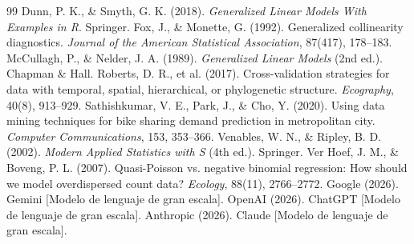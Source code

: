 \documentclass[12pt, a4paper]{article}
\numberwithin{equation}{section}
\begin{document}
\begin{thebibliography}{99}
 Dunn, P. K., \& Smyth, G. K. (2018). \textit{Generalized Linear Models With Examples in R}. Springer.
 Fox, J., \& Monette, G. (1992). Generalized collinearity diagnostics. \textit{Journal of the American Statistical Association}, 87(417), 178--183.
 McCullagh, P., \& Nelder, J. A. (1989). \textit{Generalized Linear Models} (2nd ed.). Chapman \& Hall.
 Roberts, D. R., et al. (2017). Cross-validation strategies for data with temporal, spatial, hierarchical, or phylogenetic structure. \textit{Ecography}, 40(8), 913--929.
 Sathishkumar, V. E., Park, J., \& Cho, Y. (2020). Using data mining techniques for bike sharing demand prediction in metropolitan city. \textit{Computer Communications}, 153, 353--366.
 Venables, W. N., \& Ripley, B. D. (2002). \textit{Modern Applied Statistics with S} (4th ed.). Springer.
 Ver Hoef, J. M., \& Boveng, P. L. (2007). Quasi-Poisson vs. negative binomial regression: How should we model overdispersed count data? \textit{Ecology}, 88(11), 2766--2772.
 Google (2026). Gemini [Modelo de lenguaje de gran escala].
 OpenAI (2026). ChatGPT [Modelo de lenguaje de gran escala].
 Anthropic (2026). Claude [Modelo de lenguaje de gran escala].
\end{thebibliography}
\end{document}
